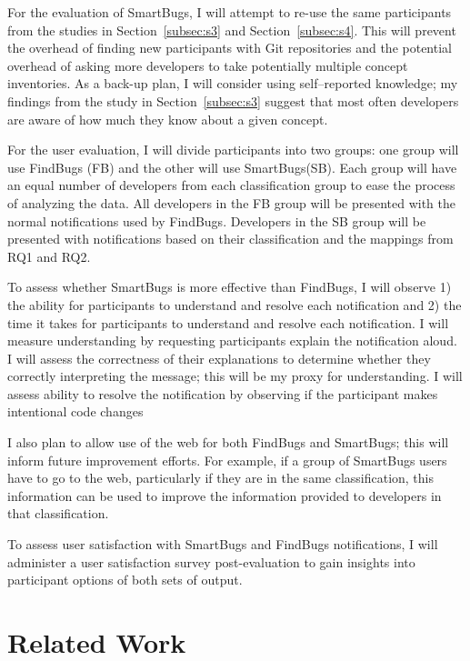 \documentclass{llncs}
\begin{document}
For the evaluation of SmartBugs, I will attempt to re-use the same participants from the studies in Section~\ref{subsec:s3} and Section~\ref{subsec:s4}. This will prevent the overhead of finding new participants with Git repositories and the potential overhead of asking more developers to take potentially multiple concept inventories.
As a back-up plan, I will consider using self--reported knowledge; my findings from the study in Section~\ref{subsec:s3} suggest that most often developers are aware of how much they know about a given concept.

For the user evaluation, I will divide participants into two groups: one group will use FindBugs (FB) and the other will use SmartBugs(SB). Each group will have an equal number of developers from each classification group to ease the process of analyzing the data. All developers in the FB group will be presented with the normal notifications used by FindBugs. Developers in the SB group will be presented with notifications based on their classification and the mappings from RQ1 and RQ2.

To assess whether SmartBugs is more effective than FindBugs, I will observe 1) the ability for participants to understand and resolve each notification and 2) the time it takes for participants to understand and resolve each notification. I will measure understanding by requesting participants explain the notification aloud. I will assess the correctness of their explanations to determine whether they correctly interpreting the message; this will be my proxy for understanding. I will assess ability to resolve the notification by observing if the participant makes intentional code changes

I also plan to allow use of the web for both FindBugs and SmartBugs; this will inform future improvement efforts. For example, if a group of SmartBugs users have to go to the web, particularly if they are in the same classification, this information can be used to improve the information provided to developers in that classification.

To assess user satisfaction with SmartBugs and FindBugs notifications, I will administer a user satisfaction survey post-evaluation to gain insights into participant options of both sets of output.



\section{Related Work}
\end{document}
